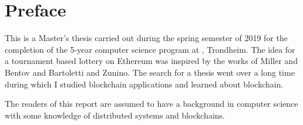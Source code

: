 \hypersetup{pageanchor=false}
%

\chapter*{Preface}


This is a Master's thesis carried out during the spring semester of 2019 for the completion of the 5-year computer science program at \NTNU, Trondheim.
The idea for a tournament based lottery on Ethereum was inspired by the works of Miller and Bentov and Bartoletti and Zunino. The search for a thesis went over a long time during which I studied blockchain applications and learned about blockchain.

The readers of this report are assumed to have a background in computer science with some knowledge of distributed systems and blockchains.

\begin{center}
\thesisdate \\[1pc]
\thesisauthor
\end{center}